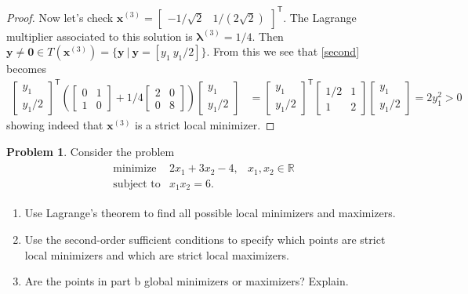 \documentclass[12pt]{article}
\theoremstyle{definition}
\newtheorem{problem}{Problem}
\newcommand{\vc}[1]{\boldsymbol{#1}}
\newcommand{\tran}{\mathsf{T}}
\begin{document}
\begin{proof}
  Now let's check $\vc{x}^{(3)} = \begin{bmatrix}-1/\sqrt{2} & 1/(2\sqrt{2})\end{bmatrix}^\tran$.
  The Lagrange multiplier associated to this solution is $\vc{\lambda}^{(3)} = 1/4$. Then $\vc{y} \neq \vc{0} \in T(\vc{x}^{(3)}) = \{\vc{y}\ |\  \vc{y} = [y_1 \ y_1/2]\}$. From this we see that \eqref{second} becomes
  \begin{align*}
    \begin{bmatrix}y_1 \\ y_1/2\end{bmatrix}^\tran\left(\begin{bmatrix}0 & 1 \\ 1 & 0\end{bmatrix} + 1/4\begin{bmatrix}2 & 0 \\ 0 &8\end{bmatrix}\right)\begin{bmatrix}y_1 \\ y_1/2\end{bmatrix} &=
    \begin{bmatrix}y_1 \\ y_1/2\end{bmatrix}^\tran\begin{bmatrix}1/2 & 1 \\ 1 & 2\end{bmatrix}\begin{bmatrix}y_1 \\ y_1/2\end{bmatrix} = 2y_1^2 > 0
  \end{align*}
  showing indeed that $\vc{x}^{(3)}$ is a strict local minimizer.
\end{proof}
\newpage


\begin{problem}
  Consider the problem
  \begin{align*}
    \begin{array}{rll}
      \text{minimize} & 2x_1 + 3x_2 - 4, & x_1, x_2 \in \mathbb{R} \\
      \text{subject to} & x_1 x_2 = 6.&
    \end{array}
  \end{align*}

  \begin{enumerate}
    \item Use Lagrange's theorem to find all possible local minimizers and maximizers.
    \item Use the second-order sufficient conditions to specify which points are strict
      local minimizers and which are strict local maximizers.
    \item Are the points in part b global minimizers or maximizers? Explain.
  \end{enumerate}
\end{problem}
\end{document}
